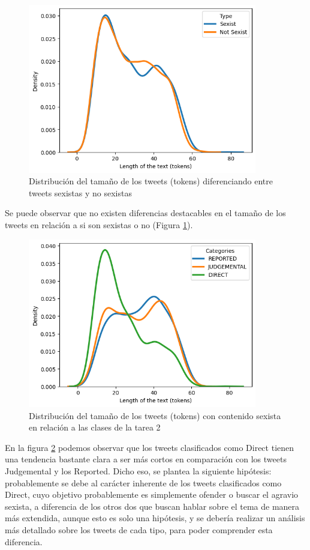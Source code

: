 \begin{figure}[H]
    \centering
    \includegraphics[width=10cm]{imagenes/Evaluacion/dataset_study/sexist_not_sexist_tokens.png}
    \caption{\centering Distribución del tamaño de los tweets (tokens) diferenciando entre tweets sexistas y no sexistas}
    \label{fig:sexist_not_sexist}
\end{figure}

Se puede observar que no existen diferencias destacables en el tamaño de los tweets en relación a si son sexistas o no (Figura \ref{fig:sexist_not_sexist}).

\begin{figure}[H]
    \centering
    \includegraphics[width=10cm]{imagenes/Evaluacion/dataset_study/task2_lenght_tokens.png}
    \caption{\centering Distribución del tamaño de los tweets (tokens) con contenido sexista en relación a las clases de la tarea 2}
    \label{fig:task2_lenght}

\end{figure}

En la figura \ref{fig:task2_lenght} podemos observar que los tweets clasificados como Direct tienen una tendencia bastante clara a ser más cortos en comparación con los tweets Judgemental y los Reported. Dicho eso, se plantea la siguiente hipótesis: probablemente se debe al carácter inherente de los tweets clasificados como Direct, cuyo objetivo probablemente es simplemente ofender o buscar el agravio sexista, a diferencia de los otros dos que buscan hablar sobre el tema de manera más extendida, aunque esto es solo una hipótesis, y se debería realizar un análisis más detallado sobre los tweets de cada tipo, para poder comprender esta diferencia. 

